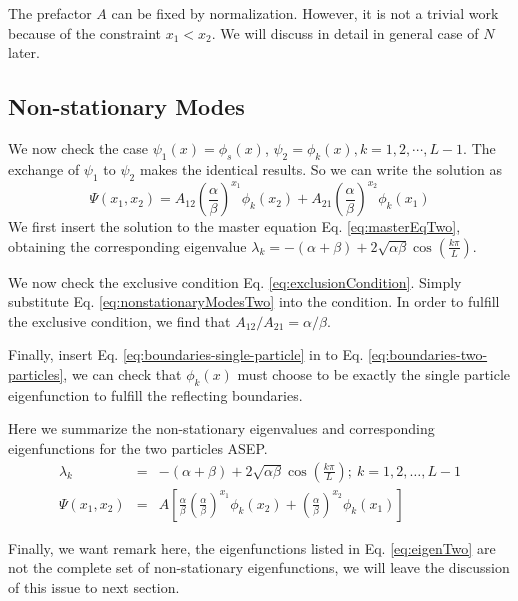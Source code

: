 \documentclass[12pt,a4paper]{article}
\begin{document}
The prefactor $A$ can be fixed by normalization. However, it is not a trivial
work because of the constraint $x_1 < x_2$. We will discuss in detail in
general case of $N$ later. 

\subsection{Non-stationary Modes}
\label{sub:non_stationary_modes}
We now check the case $\psi_1(x) = \phi_s(x)$, $\psi_2 = \phi_k(x),
k=1,2,\cdots,L-1$. The exchange of $\psi_1$ to $\psi_2$ makes the identical
results. So we can write the solution as 
\begin{equation}
    \label{eq:nonstationaryModesTwo}
    \Psi(x_1, x_2) = A_{12} \left(\frac{\alpha}{\beta}\right)^{x_1}\phi_k(x_2) 
    + A_{21} \left(\frac{\alpha}{\beta}\right)^{x_2}\phi_k(x_1) 
\end{equation}
We first insert the solution to the master equation Eq. \eqref{eq:masterEqTwo},
obtaining the corresponding eigenvalue $\lambda_k = -(\alpha+\beta) + 
2\sqrt{\alpha\beta}\cos(\frac{k\pi}{L})$.

We now check the exclusive condition Eq. \eqref{eq:exclusionCondition}. Simply
substitute Eq.  \eqref{eq:nonstationaryModesTwo} into the condition. In order to
fulfill the exclusive condition, we find that $A_{12} / A_{21} =  \alpha /
\beta$.

Finally, insert Eq. \eqref{eq:boundaries-single-particle} in to
Eq. \eqref{eq:boundaries-two-particles}, we can check that $\phi_k(x)$ must
choose to be exactly the single particle eigenfunction to fulfill the
reflecting boundaries.

Here we summarize the non-stationary eigenvalues and corresponding
eigenfunctions for the two particles ASEP. 
\begin{subequations}
    \label{eq:eigenTwo}
    \begin{eqnarray}
        \label{eq:eigenvaluesTwo}
        \lambda_k & = &
        -(\alpha+\beta) + 2\sqrt{\alpha\beta}\cos(\frac{k\pi}{L});
        ~k=1,2,\dots, L-1  \\
        \label{eq:eigenvectorsTwo}
        \Psi(x_1, x_2) & = & A\left[ \frac{\alpha}{\beta} \left(\frac{\alpha}{\beta}
            \right)^{x_1}\phi_k(x_2)+\left(\frac{\alpha}{\beta}\right)^{x_2}
            \phi_k(x_1) \right]
    \end{eqnarray}
\end{subequations}

Finally, we want remark here, the eigenfunctions listed in Eq.
\eqref{eq:eigenTwo} are not the complete set of non-stationary eigenfunctions,
we will leave the discussion of this issue to next section. 
\end{document}
